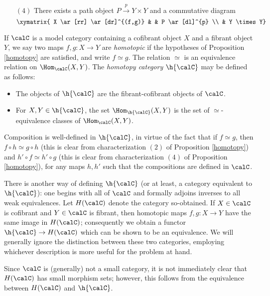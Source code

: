 \begin{Model Categories}
\begin{Already Read}
\begin{proposition}
\begin{itemize}
\item[$(4)$] There exists a path object $P \stackrel{p}{\rightarrow} Y \times Y$ and a commutative diagram $$ \xymatrix{ X  \ar[rr] \ar[dr]^{(f,g)} & & P \ar[dl]^{p} \\
 & Y \times Y}$$
\end{itemize}
\end{proposition}

If $\calC$ is a model category containing a cofibrant object $X$ and a fibrant object $Y$, we say two maps $f,g: X \rightarrow Y$ are {\it homotopic} if the hypotheses of Proposition \ref{homotopy} are satisfied, and write $f \simeq g$. The relation $\simeq$ is an equivalence relation on $\Hom_{\calC}(X,Y)$. The {\it homotopy category} $\h{\calC}$ may be defined as follows:

\begin{itemize}
\item The objects of $\h{\calC}$ are the fibrant-cofibrant objects of $\calC$.
\item For $X,Y \in \h{\calC}$, the set $\Hom_{\h{\calC}}(X,Y)$ is the set of $\simeq$-equivalence classes
of $\Hom_{\calC}(X,Y)$.
\end{itemize}

Composition is well-defined in $\h{\calC}$, in virtue of the fact that if $f \simeq g$, then
$f \circ h \simeq g \circ h$ (this is clear from characterization $(2)$ of Proposition \ref{homotopy}) and $h' \circ f \simeq h' \circ g$ (this is clear from characterization $(4)$ of Proposition \ref{homotopy}), for any maps $h,h'$ such that the compositions are defined in $\calC$.

There is another way of defining $\h{\calC}$ (or at least, a category equivalent to $\h{\calC}$): one begins with all of $\calC$ and formally adjoins inverses to all weak equivalences. Let $H(\calC)$ denote the category so-obtained. If $X \in \calC$ is cofibrant and $Y \in \calC$ is fibrant, then homotopic maps $f,g: X \rightarrow Y$ have the same image in $H(\calC)$; consequently we obtain a functor $\h{\calC} \rightarrow H(\calC)$ which can be shown to be an equivalence. We will generally ignore the distinction between these two categories, employing whichever description is more useful for the problem at hand.

\begin{remark}
Since $\calC$ is (generally) not a small category, it is not immediately clear that $H(\calC)$ has small morphism sets; however, this follows from the equivalence between $H(\calC)$ and $\h{\calC}$.
\end{remark}


\end{Already Read}
\end{Model Categories}
